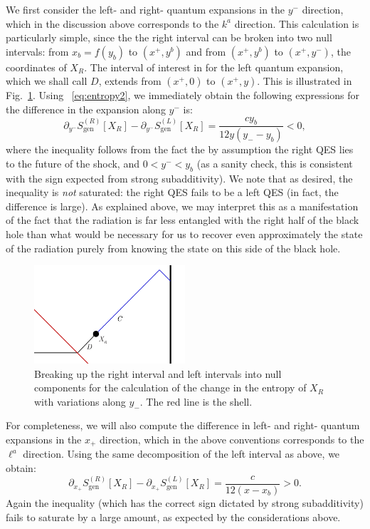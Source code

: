 \documentclass[12pt]{article}
\begin{document}
We first consider the left- and right- quantum expansions in the $y^{-}$ direction, which in the discussion above corresponds to the $k^{a}$ direction. This calculation is particularly simple, since the the right interval can be broken into two null intervals: from $x_{b}=f(y_{b})$ to $(x^{+}, y^{b})$ and from $(x^{+}, y^{b})$ to $(x^{+}, y^{-})$, the coordinates of $X_{R}$. The interval of interest in for the left quantum expansion, which we shall call $D$, extends from $(x^{+},0)$ to $(x^{+},y)$. This is illustrated in Fig.~\ref{fig:LeftVsRight}. Using ~\eqref{eq:entropy2}, we immediately obtain the following expressions for the difference in the expansion along $y^{-}$ is:
\begin{equation}
\partial_{y^{-}} S_{\mathrm{gen}}^{(R)}[X_{R}] -\partial_{y^{-}} S_{\mathrm{gen}}^{(L)}[X_{R}]= \frac{cy_{b}}{12y (y_{-}-y_{b})}< 0,
\end{equation}
where the inequality follows from the fact the by assumption the right QES lies to the future of the shock, and $0<y^{-}<y_{b}$ (as a sanity check, this is consistent with the sign expected from strong subadditivity). We note that as desired, the inequality is \textit{not} saturated: the right QES fails to be a left QES (in fact, the difference is large). As explained above, we may interpret this as a manifestation of the fact that the radiation is far less entangled with the right half of the black hole than what would be necessary for us to recover even approximately the state of the radiation purely from knowing the state on this side of the black hole.


\begin{figure}
\center
\includegraphics[width=0.5\textwidth]{LRQXS.pdf}
\caption{Breaking up the right interval and left intervals into null components for the calculation of the change in the entropy of $X_{R}$ with variations along $y_{-}$. The red line is the shell.}
\label{fig:LeftVsRight}
\end{figure}


For completeness, we will also compute the difference in left- and right- quantum expansions in the $x_{+}$ direction, which in the above conventions corresponds to the $\ell^{a}$ direction. Using the same decomposition of the left interval as above, we obtain:
\begin{equation}
\partial_{x_{+}} S_{\mathrm{gen}}^{(R)}[X_{R}] -\partial_{x_{+}} S_{\mathrm{gen}}^{(L)}[X_{R}]= \frac{c}{12(x-x_{b})}>0.
\end{equation}
Again the inequality (which has the correct sign dictated by strong subadditivity) fails to saturate by a large amount, as expected by the considerations above.
\end{document}
